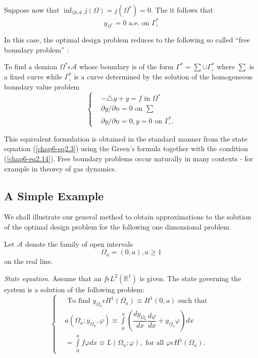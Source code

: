 Suppose now that $\inf_{\Omega \epsilon \mathscr{A}} j(\Omega) = j(\Omega^{*}) = 0$. The it follows that
\begin{equation*}
y_{\Omega^{*}} = 0 \text{ a.e. on } \Gamma_{\circ}^{*}\tag{2.14}\label{chap6-eq2.14}
\end{equation*}

In this case, the optimal design problem reduces to the following so called ``free boundary problem'' :

To find a domian $\Omega^{*} \epsilon \mathscr{A}$ whose boundary is
of the form $\Gamma^{*} = \sum \cup \Gamma_{\circ}^{*}$ where $\sum$
is a fixed curve while $\Gamma_{\circ}^{*}$ is a curve determined by
the solution of the homogeneous boundary value problem 
\begin{equation*}
\begin{cases}
& -\triangle y + y = f \text{ in } \Omega^{*}\\
& \partial y / \partial \underline{n} = 0 \text{ on } \sum\\
& \partial y / \partial \underline{n} = 0, y = 0 \text{ on } \Gamma_{\circ}^{*}.\tag*{$(2.13)''$}\label{chap6-eq2.13''}
\end{cases}
\end{equation*}\pageoriginale

This equivalent formulation is obtained in the standard manner from
the state equation (\ref{chap6-eq2.3}) using the Green's formula
together with the condition (\ref{chap6-eq2.14}). Free boundary
problems occur naturally in many contexts - for example in theorey of
gas dynamics. 

\setcounter{subsection}{1}
\subsection{A Simple Example}

We shall illustrate our general method to obtain approximations to the
solution of the optimal design problem for the following one
dimensional problem. 

Let $\mathscr{A}$ denote the family of open intervals
\begin{equation*}
\Omega_{a} = (0, a), a \geq 1\tag{2.15}\label{chap6-eq2.15}
\end{equation*}
on the real line.

{\em State equation.} Assume that an $f \epsilon L^{2} (\mathbb{R}^{1})$ is given. The state governing the system is a solution of the following problem:
\begin{equation*}
\begin{cases}
& \text{ To find } y_{\Omega_{a}} \epsilon H^{1} (\Omega_{a}) \equiv H^{1}(0, a) \text{ such that }\\
& a(\Omega_{a} ; y_{\Omega_{a}}, \varphi) \equiv \int\limits_{0}^{a}
  \left(\dfrac{dy_{\Omega_{a}}}{dx} \dfrac{d\varphi}{dx} +
  y_{\Omega_{a}} \varphi \right) dx\\
& = \int\limits_{0}^{a} f \varphi dx \equiv
  L(\Omega_{a} ; \varphi), \text{ for all } \varphi \epsilon H^{1}
  (\Omega_{a}).\tag{2.16}\label{chap6-eq2.16} 
\end{cases}
\end{equation*}

